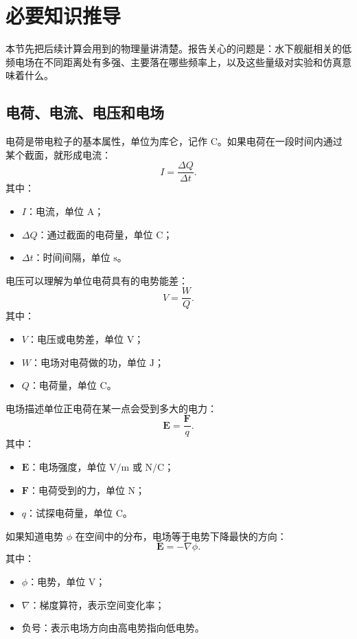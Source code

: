 \section{必要知识推导}

本节先把后续计算会用到的物理量讲清楚。报告关心的问题是：水下舰艇相关的低频电场在不同距离处有多强、主要落在哪些频率上，以及这些量级对实验和仿真意味着什么。

\subsection{电荷、电流、电压和电场}

电荷是带电粒子的基本属性，单位为库仑，记作 $\mathrm{C}$。如果电荷在一段时间内通过某个截面，就形成电流：
\begin{equation}
    I=\frac{\Delta Q}{\Delta t}.
\end{equation}
其中：
\begin{itemize}
    \item $I$：电流，单位 $\mathrm{A}$；
    \item $\Delta Q$：通过截面的电荷量，单位 $\mathrm{C}$；
    \item $\Delta t$：时间间隔，单位 $\mathrm{s}$。
\end{itemize}

电压可以理解为单位电荷具有的电势能差：
\begin{equation}
    V=\frac{W}{Q}.
\end{equation}
其中：
\begin{itemize}
    \item $V$：电压或电势差，单位 $\mathrm{V}$；
    \item $W$：电场对电荷做的功，单位 $\mathrm{J}$；
    \item $Q$：电荷量，单位 $\mathrm{C}$。
\end{itemize}

电场描述单位正电荷在某一点会受到多大的电力：
\begin{equation}
    \bm E=\frac{\bm F}{q}.
\end{equation}
其中：
\begin{itemize}
    \item $\bm E$：电场强度，单位 $\mathrm{V/m}$ 或 $\mathrm{N/C}$；
    \item $\bm F$：电荷受到的力，单位 $\mathrm{N}$；
    \item $q$：试探电荷量，单位 $\mathrm{C}$。
\end{itemize}

如果知道电势 $\phi$ 在空间中的分布，电场等于电势下降最快的方向：
\begin{equation}
    \bm E=-\nabla \phi.
\end{equation}
其中：
\begin{itemize}
    \item $\phi$：电势，单位 $\mathrm{V}$；
    \item $\nabla$：梯度算符，表示空间变化率；
    \item 负号：表示电场方向由高电势指向低电势。
\end{itemize}

